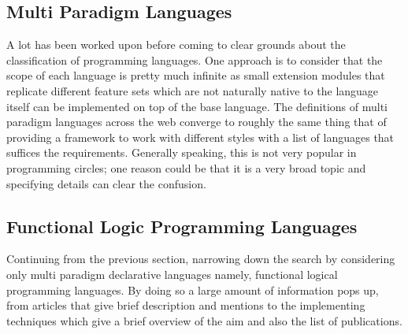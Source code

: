 \documentclass[thesis-solanki.tex]{subfiles}
\begin{document}
\subsection{Multi Paradigm Languages}

A lot has been worked upon before
coming to clear grounds about the classification of programming languages.
One approach
is to consider that the scope of each language is pretty much infinite as small extension modules that replicate
different feature sets which are not naturally native to the language itself can be implemented on top of the base language.
The definitions of multi paradigm languages across the web
\cite{website:wikimultiparadigm,website:mdn,website:blogc2} converge to roughly the same thing that of providing a
framework to work with different styles with a list of languages \cite{website:wikimpllist,website:dmoz} that suffices the requirements.
Generally speaking, this
is not very popular in programming circles; one reason could be that it
is a very broad topic and specifying details can clear the confusion.

\subsection{Functional Logic Programming Languages}

Continuing from the previous section, narrowing down the search by considering only multi paradigm declarative
languages namely, functional logical programming languages.
By doing so a large amount of information pops up, from articles that give brief description and mentions
\cite{website:wikiflpl, website:wikiflpllist} to the implementing techniques \cite{website:imlpementingflpl} which
give a brief overview of the aim and also the list of publications.
\end{document}
